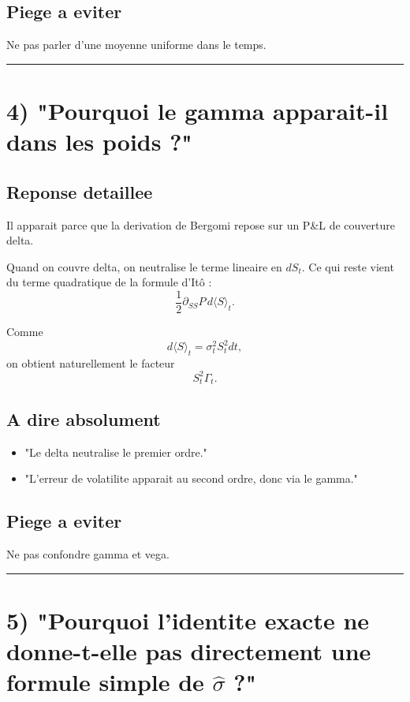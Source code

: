 \documentclass[11pt,a4paper]{article}
\begin{document}
\subsection{Piege a eviter}

Ne pas parler d'une moyenne uniforme dans le temps.

\bigskip\hrule\bigskip

\section{4) "Pourquoi le gamma apparait-il dans les poids ?"}

\subsection{Reponse detaillee}

Il apparait parce que la derivation de Bergomi repose sur un P\&{}L de couverture delta.

Quand on couvre delta, on neutralise le terme lineaire en \(dS_t\).  
Ce qui reste vient du terme quadratique de la formule d'Itô :
\[
\frac12 \partial_{SS}P\,d\langle S\rangle_t.
\]

Comme
\[
d\langle S\rangle_t=\sigma_t^2 S_t^2dt,
\]
on obtient naturellement le facteur
\[
S_t^2\Gamma_t.
\]

\subsection{A dire absolument}

\begin{itemize}
\item "Le delta neutralise le premier ordre."
\item "L'erreur de volatilite apparait au second ordre, donc via le gamma."
\end{itemize}

\subsection{Piege a eviter}

Ne pas confondre gamma et vega.

\bigskip\hrule\bigskip

\section{5) "Pourquoi l'identite exacte ne donne-t-elle pas directement une formule simple de \(\hat{\sigma}\) ?"}
\end{document}
